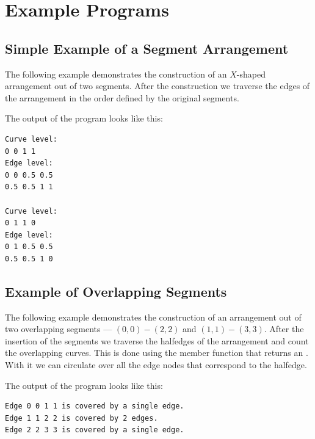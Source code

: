 \section{Example Programs}
\subsection{Simple Example of a Segment Arrangement}
The following example demonstrates the construction of an
$X$-shaped arrangement out of two segments.
After the construction we
traverse the edges of the arrangement in the order defined
by the original segments.


The output of the program looks like this:
\begin{verbatim}
Curve level:
0 0 1 1
Edge level:
0 0 0.5 0.5
0.5 0.5 1 1

Curve level:
0 1 1 0
Edge level:
0 1 0.5 0.5
0.5 0.5 1 0
\end{verbatim}

\subsection{Example of Overlapping Segments}
\label{ssec:example2}
The following example demonstrates the construction of an
arrangement out of two overlapping segments --- $(0,0)-(2,2)$
and $(1,1)-(3,3)$.
After the insertion of the segments we
traverse the halfedges
of the arrangement and count the overlapping curves.
This is done using the  member function that returns an
. With it we can circulate
over all the edge nodes that correspond to the halfedge.


The output of the program looks like this:
\begin{verbatim}
Edge 0 0 1 1 is covered by a single edge.
Edge 1 1 2 2 is covered by 2 edges.
Edge 2 2 3 3 is covered by a single edge.
\end{verbatim}


